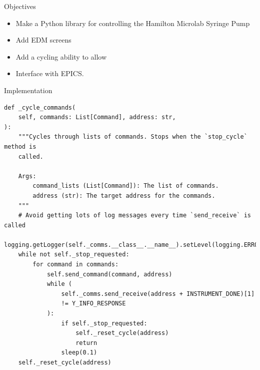 \documentclass[a0paper,landscape]{baposter}
\begin{document}
\begin{poster}
\begin{posterbox}[name=objectives,column=0,row=0,below=introduction]{Objectives}
 \begin{itemize}
    \item Make a Python library for controlling the Hamilton Microlab Syringe Pump
    \item Add EDM screens
    \item Add a cycling ability to allow
    \item Interface with EPICS.
\end{itemize}
\end{posterbox}

\begin{posterbox}[name=implementaiton,span=2,column=1]{Implementation}
\begin{verbatim}
def _cycle_commands(
    self, commands: List[Command], address: str,
):
    """Cycles through lists of commands. Stops when the `stop_cycle` method is
    called.

    Args:
        command_lists (List[Command]): The list of commands.
        address (str): The target address for the commands.
    """
    # Avoid getting lots of log messages every time `send_receive` is called
    logging.getLogger(self._comms.__class__.__name__).setLevel(logging.ERROR)
    while not self._stop_requested:
        for command in commands:
            self.send_command(command, address)
            while (
                self._comms.send_receive(address + INSTRUMENT_DONE)[1]
                != Y_INFO_RESPONSE
            ):
                if self._stop_requested:
                    self._reset_cycle(address)
                    return
                sleep(0.1)
    self._reset_cycle(address)
\end{verbatim}
\end{posterbox}

\end{poster}
\end{document}

